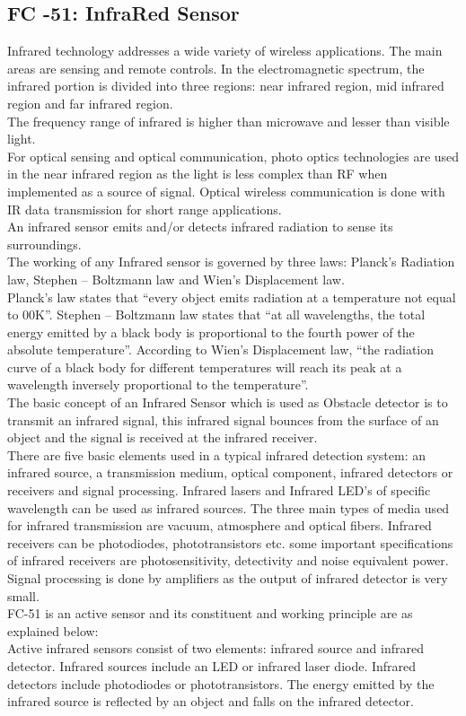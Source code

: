 \subsection{ FC -51: InfraRed Sensor}
Infrared technology addresses a wide variety of wireless applications. The main areas are sensing and remote controls. In the electromagnetic spectrum, the infrared portion is divided into three regions: near infrared region, mid infrared region and far infrared region.\\
The frequency range of infrared is higher than microwave and lesser than visible light.\\
For optical sensing and optical communication, photo optics technologies are used in the near infrared region as the light is less complex than RF when implemented as a source of signal. Optical wireless communication is done with IR data transmission for short range applications.\\
An infrared sensor emits and/or detects infrared radiation to sense its surroundings.\\
The working of any Infrared sensor is governed by three laws: Planck’s Radiation law, Stephen – Boltzmann law and Wien’s Displacement law.\\
Planck’s law states that “every object emits radiation at a temperature not equal to 00K”. Stephen – Boltzmann law states that “at all wavelengths, the total energy emitted by a black body is proportional to the fourth power of the absolute temperature”. According to Wien’s Displacement law, “the radiation curve of a black body for different temperatures will reach its peak at a wavelength inversely proportional to the temperature”.\\
The basic concept of an Infrared Sensor which is used as Obstacle detector is to transmit an infrared signal, this infrared signal bounces from the surface of an object and the signal is received at the infrared receiver.\\
There are five basic elements used in a typical infrared detection system: an infrared source, a transmission medium, optical component, infrared detectors or receivers and signal processing. Infrared lasers and Infrared LED’s of specific wavelength can be used as infrared sources. The three main types of media used for infrared transmission are vacuum, atmosphere and optical fibers. Infrared receivers can be photodiodes, phototransistors etc. some important specifications of infrared receivers are photosensitivity, detectivity and noise equivalent power. Signal processing is done by amplifiers as the output of infrared detector is very small.\\
FC-51 is an active sensor and its constituent and working principle are as explained below: \\
Active infrared sensors consist of two elements: infrared source and infrared detector. Infrared sources include an LED or infrared laser diode. Infrared detectors include photodiodes or phototransistors. The energy emitted by the infrared source is reflected by an object and falls on the infrared detector.
